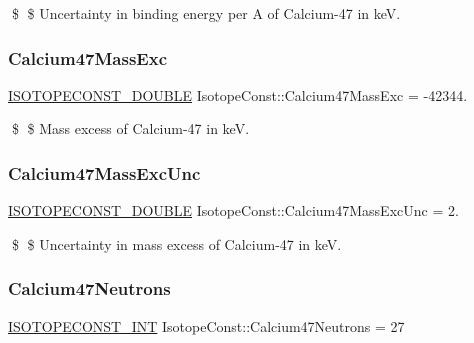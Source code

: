\$ \$ Uncertainty in binding energy per A of Calcium-\/47 in keV. \mbox{\label{group___isotope_const-_calcium-_ca47_gacf86ec2943eda388deaf4a033cecf136}} 
\subsubsection{\texorpdfstring{Calcium47\+Mass\+Exc}{Calcium47MassExc}}
{\footnotesize\ttfamily \mbox{\hyperlink{group___isotope_const-_macros_ga8f45a7272ce02c0b4c65c44636ed719a}{I\+S\+O\+T\+O\+P\+E\+C\+O\+N\+S\+T\+\_\+\+D\+O\+U\+B\+LE}} Isotope\+Const\+::\+Calcium47\+Mass\+Exc = -\/42344.}

\$ \$ Mass excess of Calcium-\/47 in keV. \mbox{\label{group___isotope_const-_calcium-_ca47_ga20908adcd6968a516fb1c8893b96e350}} 
\subsubsection{\texorpdfstring{Calcium47\+Mass\+Exc\+Unc}{Calcium47MassExcUnc}}
{\footnotesize\ttfamily \mbox{\hyperlink{group___isotope_const-_macros_ga8f45a7272ce02c0b4c65c44636ed719a}{I\+S\+O\+T\+O\+P\+E\+C\+O\+N\+S\+T\+\_\+\+D\+O\+U\+B\+LE}} Isotope\+Const\+::\+Calcium47\+Mass\+Exc\+Unc = 2.}

\$ \$ Uncertainty in mass excess of Calcium-\/47 in keV. \mbox{\label{group___isotope_const-_calcium-_ca47_ga873dafba1992bfde044b6c7c1f88389f}} 
\subsubsection{\texorpdfstring{Calcium47\+Neutrons}{Calcium47Neutrons}}
{\footnotesize\ttfamily \mbox{\hyperlink{group___isotope_const-_macros_ga5f18360b3e99483a35c32d789e62621c}{I\+S\+O\+T\+O\+P\+E\+C\+O\+N\+S\+T\+\_\+\+I\+NT}} Isotope\+Const\+::\+Calcium47\+Neutrons = 27}

